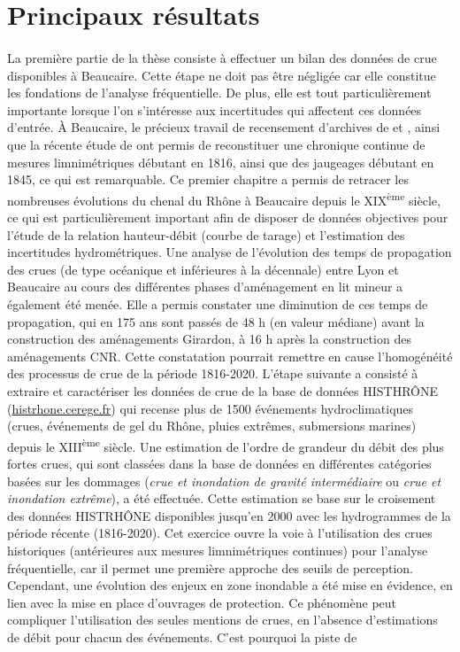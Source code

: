 	\section{Principaux résultats}
	
	\paragraph{} La première partie de la thèse consiste à effectuer un bilan des données de crue disponibles à Beaucaire. Cette étape ne doit pas être négligée car elle constitue les fondations de l'analyse fréquentielle. De plus, elle est tout particulièrement importante lorsque l'on s'intéresse aux incertitudes qui affectent ces données d'entrée. À Beaucaire, le précieux travail de recensement d'archives de \citet{pichard_les_1995} et \citet{pichard_hydro-climatology_2017}, ainsi que la récente étude de \citet{bard_actualisation_2018} ont permis de reconstituer une chronique continue de mesures limnimétriques débutant en 1816, ainsi que des jaugeages débutant en 1845, ce qui est remarquable. Ce premier chapitre a permis de retracer les nombreuses évolutions du chenal du Rhône à Beaucaire depuis le XIX\textsuperscript{ème} siècle, ce qui est particulièrement important afin de disposer de données objectives pour l'étude de la relation hauteur-débit (courbe de tarage) et l'estimation des incertitudes hydrométriques. Une analyse de l'évolution des temps de propagation des crues (de type océanique et inférieures à la décennale) entre Lyon et Beaucaire au cours des différentes phases d'aménagement en lit mineur a également été menée. Elle a permis constater une diminution de ces temps de propagation, qui en 175 ans sont passés de 48 h (en valeur médiane) avant la construction des aménagements Girardon, à 16 h après la construction des aménagements CNR. Cette constatation pourrait remettre en cause l'homogénéité des processus de crue de la période 1816-2020. L'étape suivante a consisté à extraire et caractériser les données de crue de la base de données HISTHRÔNE (\url{histrhone.cerege.fr}) qui recense plus de 1500 événements hydroclimatiques (crues, événements de gel du Rhône, pluies extrêmes, submersions marines) depuis le XIII\textsuperscript{ème} siècle. Une estimation de l'ordre de grandeur du débit des plus fortes crues, qui sont classées dans la base de données en différentes catégories basées sur les dommages (\og \textit{crue et inondation de gravité intermédiaire}\fg{} ou \og \textit{crue et inondation extrême}\fg{}), a été effectuée. Cette estimation se base sur le croisement des données HISTRHÔNE disponibles jusqu'en 2000 avec les hydrogrammes de la période récente (1816-2020). Cet exercice ouvre la voie à l'utilisation des crues historiques (antérieures aux mesures limnimétriques continues) pour l'analyse fréquentielle, car il permet une première approche des seuils de perception. Cependant, une évolution des enjeux en zone inondable a été mise en évidence, en lien avec la mise en place d'ouvrages de protection. Ce phénomène peut compliquer l'utilisation des seules mentions de crues, en l'absence d'estimations de débit pour chacun des événements. C'est pourquoi la piste de 